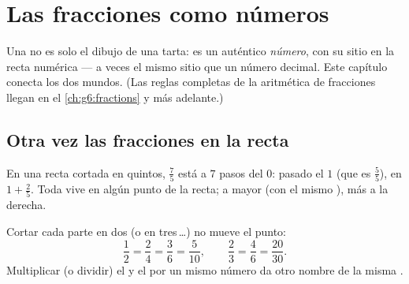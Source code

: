 \chapter{Las fracciones como números}\label{ch:g5:fractions}

Una  no es solo el dibujo de una tarta: es un auténtico
\emph{número}, con su sitio en la recta numérica --- a veces el mismo
sitio que un número decimal. Este capítulo conecta los dos
mundos. (Las reglas completas de la aritmética de fracciones llegan en el
\cref{ch:g6:fractions} y más adelante.)

\section{Otra vez las fracciones en la recta}

\begin{example}\label{ex:g5:fractions:place}
En una recta cortada en quintos, $\frac{7}{5}$ está a $7$ pasos del $0$: pasado
el $1$ (que es $\frac55$), en $1 + \frac25$. Toda  vive
en algún punto de la recta; a mayor  (con el mismo ),
más a la derecha.
\end{example}

\begin{proposition}\label{prop:g5:fractions:equal}
Cortar cada parte en dos (o en tres\,\dots) no mueve el
punto:
\[
\frac{1}{2} = \frac{2}{4} = \frac{3}{6} = \frac{5}{10},
\qquad
\frac{2}{3} = \frac{4}{6} = \frac{20}{30}.
\]
Multiplicar (o dividir) el  y el  por un
mismo número da otro nombre de la misma .
\end{proposition}
\admitted

